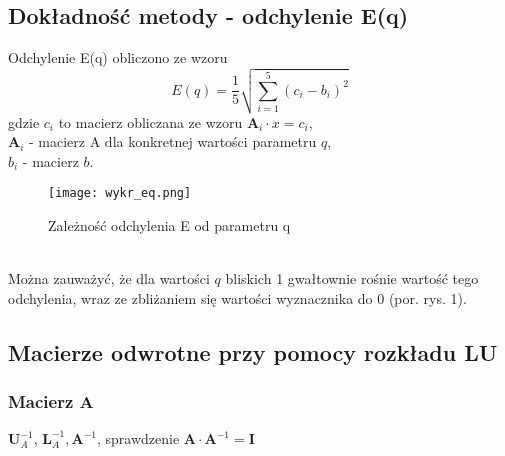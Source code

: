 \documentclass[a4paper]{article}
\begin{document}
\subsection{Dokładność metody - odchylenie E(q)}
Odchylenie E(q) obliczono ze wzoru
$$
E(q) = \frac{1}{5} \sqrt{ 
\sum_{i=1}^{5} (c_i - b_i)^2 }
$$
gdzie 
$c_{i}$ to macierz obliczana ze wzoru $\textbf{A}_i \cdot x = c_i$, \\ 
$\textbf{A}_i$ - macierz A dla konkretnej wartości parametru $q$, \\
$b_i$ - macierz $b$. 
\begin{figure}[H]
\centering
\texttt{[image: wykr\_eq.png]} 
\caption{Zależność odchylenia E od parametru q}
\label{fig:}
\end{figure} \\
Można zauważyć, że dla wartości $q$ bliskich 1 gwałtownie rośnie wartość tego odchylenia, wraz ze zbliżaniem się wartości wyznacznika do 0 (por. rys. 1).
\subsection{Macierze odwrotne przy pomocy rozkładu LU}
\subsubsection{Macierz A}
$\textbf{U}_A^{-1}$, $\textbf{L}_A^{-1}, \textbf{A}^{-1}$, sprawdzenie $\textbf{A} \cdot \textbf{A}^{-1} = \textbf{I}$
\end{document}
